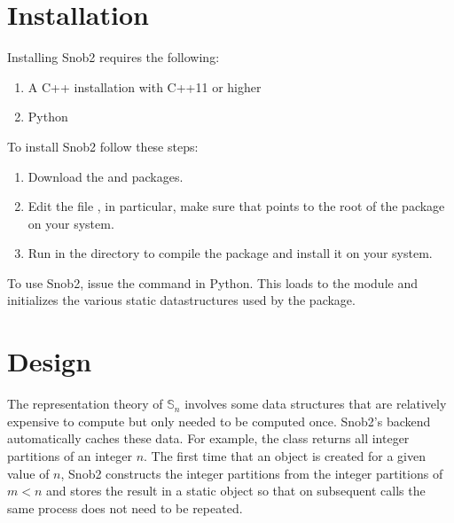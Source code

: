 \documentclass[letterpaper,10pt,english]{sphinxmanual}
\begin{document}
\chapter{Installation}
\label{\detokenize{index:installation}}
\sphinxAtStartPar
Installing Snob2 requires the following:
\begin{enumerate}
%
\item {} 
\sphinxAtStartPar
A C++ installation with C++11 or higher

\item {} 
\sphinxAtStartPar
Python

\end{enumerate}

\sphinxAtStartPar
To install Snob2 follow these steps:
\begin{enumerate}
%
\item {} 
\sphinxAtStartPar
Download the  and
 packages.

\item {} 
\sphinxAtStartPar
Edit the file , in particular, make sure that  points to the root of
the  package on your system.

\item {} 
\sphinxAtStartPar
Run  in the  directory to compile the package and install it on your
system.

\end{enumerate}

\sphinxAtStartPar
To use Snob2, issue the command  in Python. This loads to the  module and initializes
the various static datastructures used by the package.


\chapter{Design}
\label{\detokenize{index:design}}
\sphinxAtStartPar
The representation theory of \(\mathbb{S}_n\) involves some data structures that are relatively
expensive to compute but only needed to be computed once. Snob2’s backend automatically caches these data.
For example, the class  returns all integer partitions of an integer \(n\).
The first time that an  object is created for a given value of \(n\), Snob2
constructs the integer partitions from the integer partitions of \(m<n\) and stores the result
in a static object so that on subsequent calls the same process does not need to be repeated.
\end{document}
